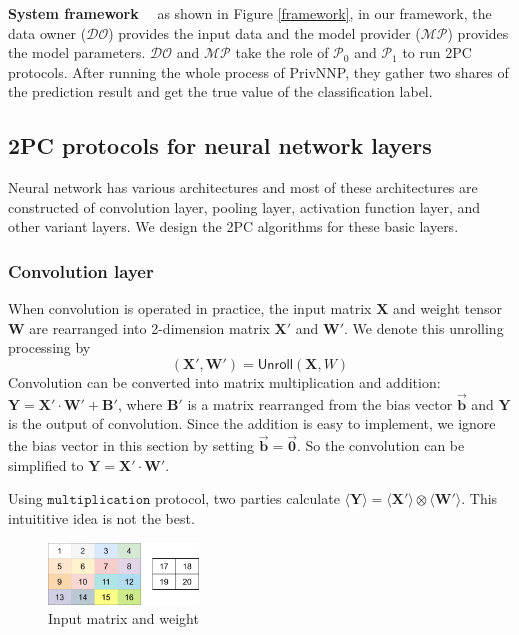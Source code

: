 \documentclass[letterpaper]{article} %
\begin{document}
    \textbf{System framework}~~
    as shown in Figure \ref{framework}, in our framework,
    the data owner ($\mathcal{DO}$) provides the input data
    and the model provider ($\mathcal{MP}$) provides the model parameters.
    $\mathcal{DO}$ and $\mathcal{MP}$ take the role of
    $\mathcal{P}_{0}$ and $\mathcal{P}_{1}$ to run 2PC protocols.
    After running the whole process of PrivNNP, they gather two shares of the prediction result and
    get the true value of the classification label.

\subsection{2PC protocols for neural network layers}
    Neural network has various architectures and
    most of these architectures are constructed of convolution layer,
    pooling layer, activation function layer, and other variant layers.
    We design the 2PC algorithms for these basic layers.



    \subsubsection{Convolution layer}


    When convolution is operated in practice,
    the input matrix $\mathbf{X}$ and weight tensor $\mathbf{W}$
    are rearranged into 2-dimension matrix $\mathbf{X}'$ and $\mathbf{W}'$.
    We denote this unrolling processing by
    $$(\mathbf{X}',\mathbf{W}')=\mathsf{Unroll} (\mathbf{X},W)$$
    Convolution can be converted into matrix multiplication and addition:
    $\mathbf{Y}=\mathbf{X}'\cdot \mathbf{W}'+\mathbf{B}'$, where $\mathbf{B}'$ is a matrix rearranged from the bias vector $\overrightarrow{\mathbf{b}}$ and
    $\mathbf{Y}$ is the output of convolution.
    Since the addition is easy to implement, we ignore the bias vector in this section by setting $\overrightarrow{\mathbf{b}}=\overrightarrow{\mathbf{0}}$.
    So the convolution can be simplified to $\mathbf{Y}=\mathbf{X}'\cdot \mathbf{W}'$.

    Using $\mathtt{multiplication}$ protocol,
    two parties calculate $\langle \mathbf{Y}\rangle=\langle \mathbf{X'}\rangle\otimes \langle \mathbf{W'}\rangle$.
    This intuititive idea is not the best.
    \begin{figure}[htbp]
        \centering
        \includegraphics[width=4cm]{new_unrolling.png}
        \caption{Input matrix and weight}
        \label{input matrix and weight}
    \end{figure}
\end{document}
